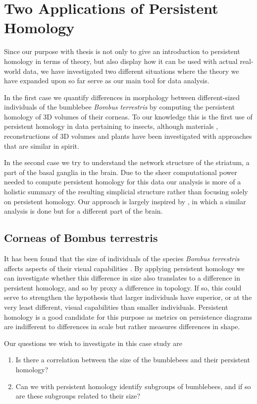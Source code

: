 \chapter{Two Applications of Persistent Homology}
Since our purpose with thesis is not only to give an introduction to persistent homology in terms of theory, but also display how it can be used with actual real-world data, we have investigated two different situations where the theory we have expanded upon so far serve as our main tool for data analysis.

In the first case we quantify differences in morphology between different-sized individuals of the bumblebee \textit{Bombus terrestris} by computing the persistent homology of 3D volumes of their corneas. To our knowledge this is the first use of persistent homology in data pertaining to insects, although materials \cite{moon2019, delgadofriedrichs2014}, reconstructions of 3D volumes \cite{gutierrez2012, gutierrez2014} and plants \cite{plants} have been investigated with approaches that are similar in spirit.

In the second case we try to understand the network structure of the striatum, a part of the basal ganglia in the brain. Due to the sheer computational power needed to compute persistent homology for this data our analysis is more of a holistic summary of the resulting simplicial structure rather than focusing solely on persistent homology. Our approach is largely inspired by \cite{reimann}, in which a similar analysis is done but for a different part of the brain.

\section{Corneas of Bombus terrestris}
It has been found that the size of individuals of the species \textit{Bombus terrestris} affects aspects of their visual capabilities \cite{emily}. By applying persistent homology we can investigate whether this difference in size also translates to a difference in persistent homology, and so by proxy a difference in topology. If so, this could serve to strengthen the hypothesis that larger individuals have superior, or at the very least different, visual capabilities than smaller individuals. Persistent homology is a good candidate for this purpose as metrics on persistence diagrams are indifferent to differences in scale but rather measures differences in shape.

Our questions we wish to investigate in this case study are
\begin{enumerate}
  \item Is there a correlation between the size of the bumblebees and their persistent homology?
  \item Can we with persistent homology identify subgroups of bumblebees, and if so are these subgroups related to their size?

\end{enumerate}
